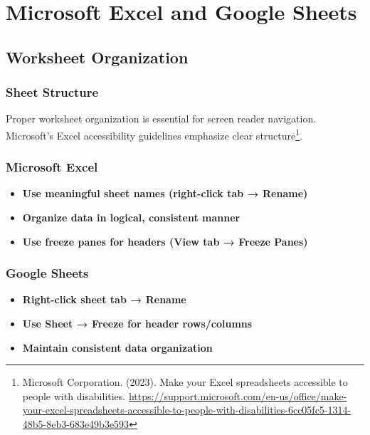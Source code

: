 \section{Microsoft Excel and Google Sheets}
\label{sec:excel-google-sheets}

\subsection{Worksheet Organization}

\subsubsection{Sheet Structure}
Proper worksheet organization is essential for screen reader navigation. Microsoft's Excel accessibility guidelines emphasize clear structure\footnote{Microsoft Corporation. (2023). Make your Excel spreadsheets accessible to people with disabilities. \url{https://support.microsoft.com/en-us/office/make-your-excel-spreadsheets-accessible-to-people-with-disabilities-6cc05fc5-1314-48b5-8eb3-683e49b3e593}}.

\subsubsection{Microsoft Excel}
\vspace{1em}
\begin{itemize}
\item \textbf{Use meaningful sheet names (right-click tab → Rename)}
\item \textbf{Organize data in logical, consistent manner}
\item \textbf{Use freeze panes for headers (View tab → Freeze Panes)}
\end{itemize}
\vspace{1em}

\subsubsection{Google Sheets}
\vspace{1em}
\begin{itemize}
\item \textbf{Right-click sheet tab → Rename}
\item \textbf{Use Sheet → Freeze for header rows/columns}
\item \textbf{Maintain consistent data organization}
\end{itemize}
\vspace{1em}

